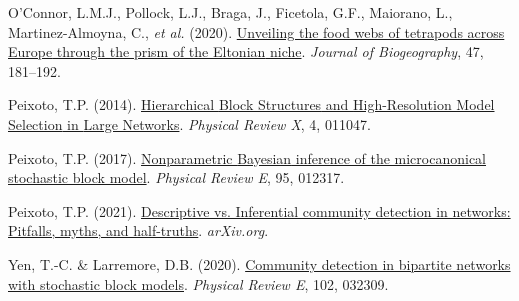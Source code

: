 \documentclass[
]{article}
\newlength{\cslhangindent}
\newlength{\cslentryspacingunit} %
\newenvironment{CSLReferences}[2] %
 {%
  \setlength{\parindent}{0pt}
  \ifodd #1
  \let\oldpar\par
  \def\par{\hangindent=\cslhangindent\oldpar}
  \fi
  \setlength{\parskip}{#2\cslentryspacingunit}
 }%
 {}
\begin{document}
\begin{CSLReferences}{1}{0}
\leavevmode{}%
O'Connor, L.M.J., Pollock, L.J., Braga, J., Ficetola, G.F., Maiorano,
L., Martinez-Almoyna, C., \emph{et al.} (2020).
\href{https://doi.org/10.1111/jbi.13773}{Unveiling the food webs of
tetrapods across {Europe} through the prism of the {Eltonian} niche}.
\emph{Journal of Biogeography}, 47, 181--192.

\leavevmode{}%
Peixoto, T.P. (2014).
\href{https://doi.org/10.1103/PhysRevX.4.011047}{Hierarchical {Block
Structures} and {High-Resolution Model Selection} in {Large Networks}}.
\emph{Physical Review X}, 4, 011047.

\leavevmode{}%
Peixoto, T.P. (2017).
\href{https://doi.org/10.1103/PhysRevE.95.012317}{Nonparametric
{Bayesian} inference of the microcanonical stochastic block model}.
\emph{Physical Review E}, 95, 012317.

\leavevmode{}%
Peixoto, T.P. (2021).
\href{https://doi.org/10.1017/9781009118897}{Descriptive vs. Inferential
community detection in networks: Pitfalls, myths, and half-truths}.
\emph{arXiv.org}.

\leavevmode{}%
Yen, T.-C. \& Larremore, D.B. (2020).
\href{https://doi.org/10.1103/PhysRevE.102.032309}{Community detection
in bipartite networks with stochastic block models}. \emph{Physical
Review E}, 102, 032309.

\end{CSLReferences}
\end{document}
